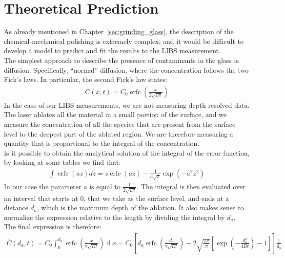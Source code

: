 \section{Theoretical Prediction}
\label{sec:theoretical_prediction}
As already mentioned in Chapter~\ref{sec:grinding_glass}, the description of the chemical-mechanical polishing is extremely complex, and it would be difficult to develop a model to predict and fit the results to the LIBS measurement.
\\
The simplest approach to describe the presence of contaminants in the glass is diffusion. Specifically, “normal” diffusion, where the concentration follows the two Fick’s laws. In particular, the second Fick’s law states:
\begin{align}
    C\left(x,t\right)=C_0\operatorname{erfc}\left(\frac{x}{2\sqrt{Dt}}\right) \label{eq:second_fick}
\end{align}
In the case of our LIBS measurements, we are not measuring depth resolved data. The laser ablates all the material in a small portion of the surface, and we measure the concentration of all the species that are present from the surface level to the deepest part of the ablated region. We are therefore measuring a quantity that is proportional to the integral of the concentration.
\\
Is it possible to obtain the analytical solution of the integral of the error function, by looking at some tables we find that:
\begin{align}
    \int\operatorname{erfc}\left(az\right)dz=z\operatorname{erfc}\left(az\right)-\frac{1}{a\sqrt\pi}\exp{\left(-a^2z^2\right)} \label{eq:integral_erfc}
\end{align}
In our case the parameter $a$ is equal to $\frac{1}{2\sqrt{Dt}}$. The integral is then evaluated over an interval that starts at 0, that we take as the surface level, and ends at a distance $d_a$, which is the maximum depth of the ablation. It also makes sense to normalize the expression relative to the length by dividing the integral by $d_a$.
\\
The final expression is therefore: 
 \begin{align}
    \overline{C}\left(d_{a},t\right)=C_{0}\int_{0}^{d_{a}}\operatorname{erfc}\left(\frac{x}{2\sqrt{Dt}}\right)\operatorname{d}x=C_{0}\left[d_{a}\operatorname{erfc}\left(\frac{d_{a}}{2\sqrt{Dt}}\right)-2\sqrt{\frac{Dt}{\pi}}\left[\exp\left(-\frac{d_{a}^{2}}{4Dt}\right)-1\right]\right]\frac{1}{d_a} \label{eq:c_bar_equation}
 \end{align}
